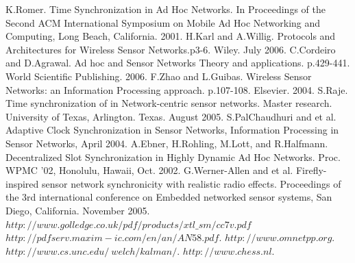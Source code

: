 \documentclass[a4paper,10pt]{report}
\begin{document}
\begin{thebibliography}{\textbf{References}}
K.Romer. Time Synchronization in Ad Hoc Networks. In Proceedings of the Second ACM International Symposium on Mobile Ad Hoc Networking and Computing, Long Beach, California. 2001.
H.Karl and A.Willig. Protocols and Architectures for Wireless Sensor Networks.p3-6. Wiley. July 2006.
C.Cordeiro and D.Agrawal. Ad hoc and Sensor Networks Theory and applications. p.429-441. World Scientific Publishing. 2006.
F.Zhao and  L.Guibas. Wireless Sensor Networks: an Information Processing approach. p.107-108. Elsevier. 2004.
 S.Raje. Time synchronization of in Network-centric sensor networks. Master research. University of Texas, Arlington. Texas. August 2005.
S.PalChaudhuri and et al. Adaptive Clock Synchronization in Sensor Networks, Information Processing in Sensor Networks, April 2004.
A.Ebner, H.Rohling, M.Lott, and R.Halfmann. Decentralized Slot Synchronization in Highly Dynamic Ad Hoc Networks. Proc. WPMC '02, Honolulu, Hawaii, Oct. 2002.
G.Werner-Allen and et al. Firefly-inspired sensor network synchronicity with realistic radio effects. Proceedings of the 3rd international conference on Embedded networked sensor systems, San Diego, California. November 2005.
 $http://www.golledge.co.uk/pdf/products/xtl\_sm/cc7v.pdf$
 $http://pdfserv.maxim-ic.com/en/an/AN58.pdf$.
$http://www.omnetpp.org$.
$http://www.cs.unc.edu/~welch/kalman/$.
$http://www.chess.nl$.
\end{thebibliography}
\end{document}
